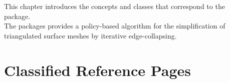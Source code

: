 


This chapter introduces the concepts and classes that correspond to the \cgal\  package.\\
The packages provides a policy-based algorithm for the simplification of triangulated surface meshes
by iterative edge-collapsing.


\section{Classified Reference Pages}

 \\
 \\
 \\
 \\
 \\
 \\

